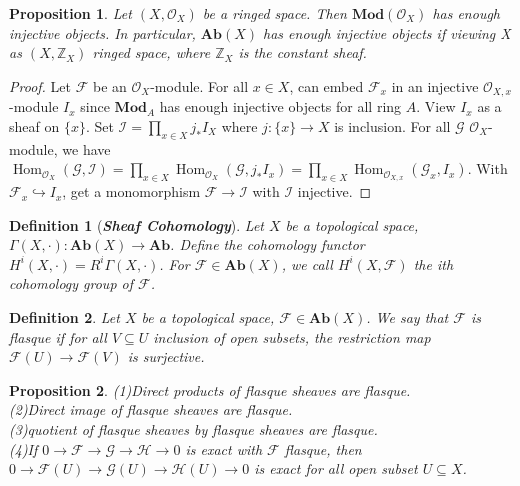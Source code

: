 \documentclass{ctexart}
\newtheorem{definition}{Definition}[section]
\newtheorem{proposition}{Proposition}[section]
\renewcommand{\hom}{\operatorname{Hom}}
\newcommand{\abeliangroups}{\mathbf{Ab}}
\newcommand{\module}{\mathbf{Mod}}
\begin{document}
\begin{proposition}
    Let $(X, \mathcal{O}_{X})$ be a ringed space.
    Then $\module (\mathcal{O}_{X})$ has enough injective objects.
    In particular, $\abeliangroups (X)$ has enough injective objects if viewing X as $(X, \mathbb{Z}_{X})$ ringed space, where $\mathbb{Z}_{X}$ is the constant sheaf.
    \label{Proposition 7.2}
\end{proposition}
\begin{proof}
    Let $\mathcal{F}$ be an $\mathcal{O}_{X}$-module.
    For all $x\in X$, can embed $\mathcal{F}_{x}$ in an injective $\mathcal{O}_{X, x}$-module $I_{x}$ since $\module_{A}$ has enough injective objects for all ring $A$.
    View $I_{x}$ as a sheaf on $\{x\}$.
    Set $\mathcal{I} = \prod_{x\in X} j_{\ast}I_{X}$ where $j: \{x\} \longrightarrow X$ is inclusion.
    For all $\mathcal{G}$ $\mathcal{O}_{X}$-module, we have $\hom_{\mathcal{O}_{X}}(\mathcal{G}, \mathcal{I}) = \prod_{x\in X} \hom_{\mathcal{O}_{X}}(\mathcal{G}, j_{\ast}I_{x}) = \prod_{x\in X} \hom_{\mathcal{O}_{X, x}}(\mathcal{G}_{x}, I_{x})$.
    With $\mathcal{F}_{x} \hookrightarrow I_{x}$, get a monomorphism $\mathcal{F} \longrightarrow \mathcal{I}$ with $\mathcal{I}$ injective.
\end{proof}
\begin{definition}[\textbf{\emph{Sheaf Cohomology}}]
    Let $X$ be a topological space, $\Gamma(X, \cdot): \abeliangroups (X) \longrightarrow \abeliangroups$.
    Define the cohomology functor $H^{i}(X, \cdot) = R^{i}\Gamma(X, \cdot)$.
    For $\mathcal{F}\in \abeliangroups (X)$, we call $H^{i}(X, \mathcal{F})$ the ith cohomology group of $\mathcal{F}$.
\end{definition}
\begin{definition}
    Let $X$ be a topological space, $\mathcal{F}\in \abeliangroups (X)$.
    We say that $\mathcal{F}$ is flasque if for all $V \subseteq U$ inclusion of open subsets,
    the restriction map $\mathcal{F}(U) \longrightarrow \mathcal{F}(V)$ is surjective.
\end{definition}
\begin{proposition}
    (1)Direct products of flasque sheaves are flasque. \\
    (2)Direct image of flasque sheaves are flasque. \\
    (3)quotient of flasque sheaves by flasque sheaves are flasque. \\
    (4)If $0 \longrightarrow \mathcal{F} \longrightarrow \mathcal{G} \longrightarrow \mathcal{H} \longrightarrow 0$ is exact with $\mathcal{F}$ flasque,
    then $0 \longrightarrow \mathcal{F}(U) \longrightarrow \mathcal{G}(U) \longrightarrow \mathcal{H}(U) \longrightarrow 0$ is exact for all open subset $U \subseteq X$.
    \label{Proposition 7.3}
\end{proposition}
\end{document}
